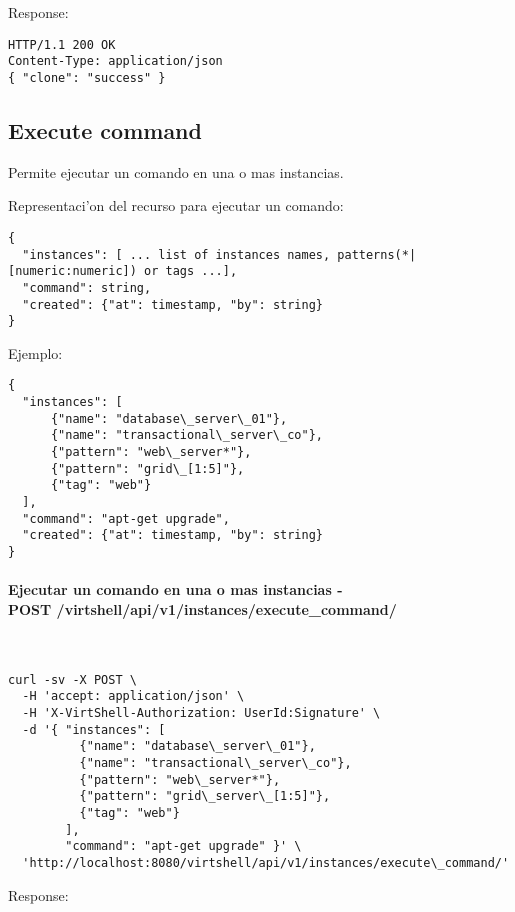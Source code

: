 Response:

\begin{lstlisting}[style=json]
HTTP/1.1 200 OK
Content-Type: application/json
{ "clone": "success" }
\end{lstlisting}

\subsection{Execute command}

Permite ejecutar un comando en una o mas instancias.

Representaci'on del recurso para ejecutar un comando:

\medskip
\begin{lstlisting}[style=json]
{
  "instances": [ ... list of instances names, patterns(*|[numeric:numeric]) or tags ...],
  "command": string,
  "created": {"at": timestamp, "by": string}
}
\end{lstlisting}

Ejemplo:

\medskip
\begin{lstlisting}[style=json]
{
  "instances": [
      {"name": "database\_server\_01"},
      {"name": "transactional\_server\_co"},      
      {"pattern": "web\_server*"},
      {"pattern": "grid\_[1:5]"},
      {"tag": "web"}
  ],
  "command": "apt-get upgrade",
  "created": {"at": timestamp, "by": string}
}
\end{lstlisting}

\paragraph{Ejecutar un comando en una o mas instancias - \\ POST /virtshell/api/v1/instances/execute\_command/} ~\\

\begin{lstlisting}[style=json]
curl -sv -X POST \
  -H 'accept: application/json' \
  -H 'X-VirtShell-Authorization: UserId:Signature' \
  -d '{ "instances": [
          {"name": "database\_server\_01"},
          {"name": "transactional\_server\_co"},          
          {"pattern": "web\_server*"},
          {"pattern": "grid\_server\_[1:5]"},
          {"tag": "web"}
        ],
        "command": "apt-get upgrade" }' \
  'http://localhost:8080/virtshell/api/v1/instances/execute\_command/'
\end{lstlisting}

Response:

